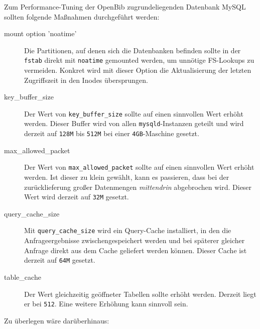 \documentclass[11pt, twoside, a4paper, BCOR8mm, DIV12, bibtotoc,idxtotoc]{scrbook}
\begin{document}
Zum Performance-Tuning der OpenBib zugrundeliegenden Datenbank MySQL
sollten folgende Maßnahmen durchgeführt werden:

\begin{description}
\item[mount option 'noatime'] Die Partitionen, auf denen sich die
  Datenbanken befinden sollte in der \texttt{fstab} direkt mit
  \texttt{noatime} gemounted werden, um unnötige FS-Lookups zu
  vermeiden. Konkret wird mit dieser Option die Aktualisierung der
  letzten Zugriffszeit in den Inodes übersprungen.
\item[key\_buffer\_size] Der Wert von
  \texttt{key\_buffer\_size} sollte auf einen sinnvollen Wert erhöht
  werden. Dieser Buffer wird von allen \texttt{mysqld}-Instanzen
  geteilt und wird derzeit auf \texttt{128M} bis \texttt{512M} bei
  einer \texttt{4GB}-Maschine gesetzt.
\item[max\_allowed\_packet] Der Wert von
  \texttt{max\_allowed\_packet} sollte auf einen sinnvollen Wert
  erhöht werden. Ist dieser zu klein gewählt, kann es passieren,
  dass bei der zurücklieferung großer Datenmengen
  \textit{mittendrin} abgebrochen wird. Dieser Wert wird derzeit auf
  \texttt{32M} gesetzt.
\item[query\_cache\_size] Mit \texttt{query\_cache\_size}
  wird ein Query-Cache installiert, in den die Anfrageergebnisse
  zwischengespeichert werden und bei späterer gleicher Anfrage direkt
  aus dem Cache geliefert werden können. Dieser Cache ist derzeit auf
  \texttt{64M} gesetzt.
  \item[table\_cache] Der Wert gleichzeitig geöffneter Tabellen
    sollte erhöht werden. Derzeit liegt er bei \texttt{512}. Eine
    weitere Erhöhung kann sinnvoll sein.
\end{description}

Zu überlegen wäre darüberhinaus:
\end{document}
